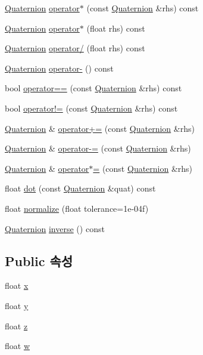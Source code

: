 \begin{DoxyCompactItemize}
\hyperlink{classcpf_1_1_quaternion}{Quaternion} \hyperlink{classcpf_1_1_quaternion_a6f21995cdf9bfc8892b41f64e88c7fac}{operator$\ast$} (const \hyperlink{classcpf_1_1_quaternion}{Quaternion} \&rhs) const
\item 
\hyperlink{classcpf_1_1_quaternion}{Quaternion} \hyperlink{classcpf_1_1_quaternion_a248bcc49e9e22d152e8e0dad9b5346da}{operator$\ast$} (float rhs) const
\item 
\hyperlink{classcpf_1_1_quaternion}{Quaternion} \hyperlink{classcpf_1_1_quaternion_a17d09acedf7ab8fd7dd125bedf395662}{operator/} (float rhs) const
\item 
\hyperlink{classcpf_1_1_quaternion}{Quaternion} \hyperlink{classcpf_1_1_quaternion_a3334827293427e76daab54a9ab3ca2c3}{operator-\/} () const
\item 
bool \hyperlink{classcpf_1_1_quaternion_ac8b812eebaf1a27cdd844267bb19cf61}{operator==} (const \hyperlink{classcpf_1_1_quaternion}{Quaternion} \&rhs) const
\item 
bool \hyperlink{classcpf_1_1_quaternion_a9a1695acee02b317fb4140a2e63e8132}{operator!=} (const \hyperlink{classcpf_1_1_quaternion}{Quaternion} \&rhs) const
\item 
\hyperlink{classcpf_1_1_quaternion}{Quaternion} \& \hyperlink{classcpf_1_1_quaternion_ac4720430dfd27c0f77b8eaa0f3439e55}{operator+=} (const \hyperlink{classcpf_1_1_quaternion}{Quaternion} \&rhs)
\item 
\hyperlink{classcpf_1_1_quaternion}{Quaternion} \& \hyperlink{classcpf_1_1_quaternion_a02f597bd2b0d9c3c7410e409f7f63090}{operator-\/=} (const \hyperlink{classcpf_1_1_quaternion}{Quaternion} \&rhs)
\item 
\hyperlink{classcpf_1_1_quaternion}{Quaternion} \& \hyperlink{classcpf_1_1_quaternion_a7dde75afc2e3e840efcd7cd782929c3e}{operator$\ast$=} (const \hyperlink{classcpf_1_1_quaternion}{Quaternion} \&rhs)
\item 
float \hyperlink{classcpf_1_1_quaternion_af5daf9d5ace6555f220e3af815c7cc5c}{dot} (const \hyperlink{classcpf_1_1_quaternion}{Quaternion} \&quat) const
\item 
float \hyperlink{classcpf_1_1_quaternion_aa49b8cb06b215e91f36fb2ec0d8741ed}{normalize} (float tolerance=1e-\/04f)
\item 
\hyperlink{classcpf_1_1_quaternion}{Quaternion} \hyperlink{classcpf_1_1_quaternion_a0cae7c07c095413e9eaf91dc7400ace2}{inverse} () const
\end{DoxyCompactItemize}
\subsection*{Public 속성}
\begin{DoxyCompactItemize}
\item 
float \hyperlink{classcpf_1_1_quaternion_a200f7bce4e673281af8cc7dd75cb0677}{x}
\item 
float \hyperlink{classcpf_1_1_quaternion_a4fbade6e58be55a49c94e7f157988136}{y}
\item 
float \hyperlink{classcpf_1_1_quaternion_ade9c41b717605118e5fdf95d96a843b4}{z}
\item 
float \hyperlink{classcpf_1_1_quaternion_af312a196b39bb4903b876bc454ac15f8}{w}
\end{DoxyCompactItemize}
